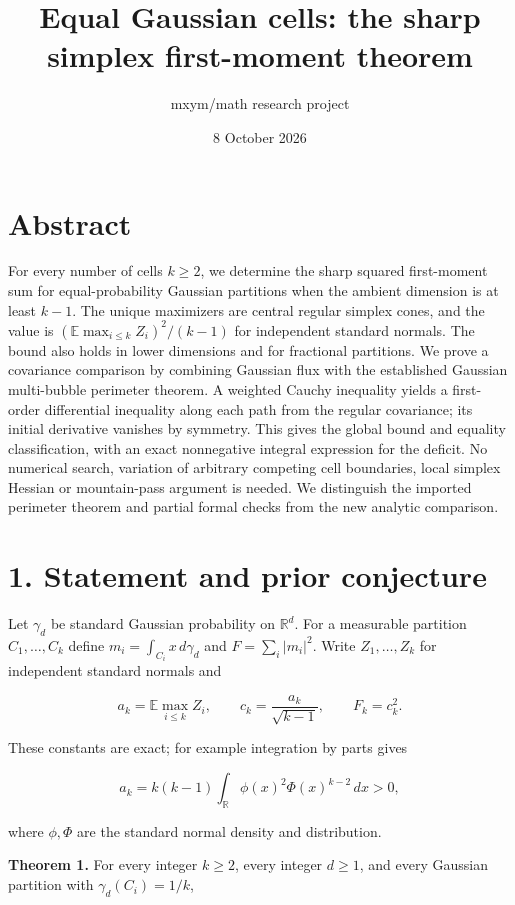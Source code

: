 \documentclass[
  11pt,
]{article}
\title{Equal Gaussian cells: the sharp simplex first-moment theorem}
\author{mxym/math research project}
\date{8 October 2026}
\begin{document}
\maketitle

\section{Abstract}\label{abstract}

For every number of cells \(k\ge2\), we determine the sharp squared
first-moment sum for equal-probability Gaussian partitions when the
ambient dimension is at least \(k-1\). The unique maximizers are central
regular simplex cones, and the value is
\((\mathbb E\max_{i\le k}Z_i)^2/(k-1)\) for independent standard
normals. The bound also holds in lower dimensions and for fractional
partitions. We prove a covariance comparison by combining Gaussian flux
with the established Gaussian multi-bubble perimeter theorem. A weighted
Cauchy inequality yields a first-order differential inequality along
each path from the regular covariance; its initial derivative vanishes
by symmetry. This gives the global bound and equality classification,
with an exact nonnegative integral expression for the deficit. No
numerical search, variation of arbitrary competing cell boundaries,
local simplex Hessian or mountain-pass argument is needed. We
distinguish the imported perimeter theorem and partial formal checks
from the new analytic comparison.

\section{1. Statement and prior
conjecture}\label{statement-and-prior-conjecture}

Let \(\gamma_d\) be standard Gaussian probability on \(\mathbb R^d\).
For a measurable partition \(C_1,\ldots,C_k\) define
\(m_i=\int_{C_i}x\,d\gamma_d\) and \(F=\sum_i|m_i|^2\). Write
\(Z_1,\ldots,Z_k\) for independent standard normals and

\[
 a_k=\mathbb E\max_{i\le k}Z_i,
 \qquad c_k=\frac{a_k}{\sqrt{k-1}},\qquad F_k=c_k^2.
\]

These constants are exact; for example integration by parts gives

\[
 a_k=k(k-1)\int_{\mathbb R}\phi(x)^2\Phi(x)^{k-2}\,dx>0,       \tag{1}
\]

where \(\phi,\Phi\) are the standard normal density and distribution.

\textbf{Theorem 1.} For every integer \(k\ge2\), every integer
\(d\ge1\), and every Gaussian partition with \(\gamma_d(C_i)=1/k\),
\end{document}
